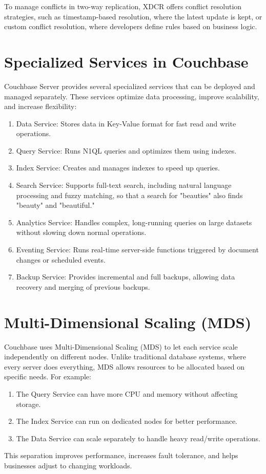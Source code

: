 To manage conflicts in two-way replication, XDCR offers conflict resolution strategies, such as timestamp-based resolution, where the latest update is kept, or custom conflict resolution, where developers define rules based on business logic.
\section{Specialized Services in Couchbase}
Couchbase Server provides several specialized services that can be deployed and managed separately. These services optimize data processing, improve scalability, and increase flexibility:
\begin{enumerate}
    \item Data Service: Stores data in Key-Value format for fast read and write operations.
    \item Query Service: Runs N1QL queries and optimizes them using indexes.
    \item Index Service: Creates and manages indexes to speed up queries.
    \item Search Service: Supports full-text search, including natural language processing and fuzzy matching, so that a search for "beauties" also finds "beauty" and "beautiful."
    \item Analytics Service: Handles complex, long-running queries on large datasets without slowing down normal operations.
    \item Eventing Service: Runs real-time server-side functions triggered by document changes or scheduled events.
    \item Backup Service: Provides incremental and full backups, allowing data recovery and merging of previous backups.
  \end{enumerate}
\section{Multi-Dimensional Scaling (MDS)}
Couchbase uses Multi-Dimensional Scaling (MDS) to let each service scale independently on different nodes. Unlike traditional database systems, where every server does everything, MDS allows resources to be allocated based on specific needs.
For example:

\begin{enumerate}
    \item The Query Service can have more CPU and memory without affecting storage.
    \item The Index Service can run on dedicated nodes for better performance.
    \item The Data Service can scale separately to handle heavy read/write operations.
  \end{enumerate}
This separation improves performance, increases fault tolerance, and helps businesses adjust to changing workloads.
